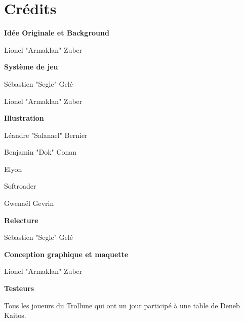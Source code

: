 \clearpage

\chapter*{Crédits}

\begin{center}

\vskip 30pt

\textbf{Idée Originale et Background}

Lionel "Armaklan" Zuber

\vskip 30pt

\textbf{Système de jeu}

Sébastien "Segle" Gelé

Lionel "Armaklan" Zuber

\vskip 30pt

\textbf{Illustration}

Léandre "Salanael" Bernier

Benjamin "Dok" Conan

Elyon

Softroader

Gwenaël Gevrin 

\vskip 30pt

\textbf{Relecture}

Sébastien "Segle" Gelé

\vskip 30pt

\textbf{Conception graphique et maquette}

Lionel "Armaklan" Zuber

\vskip 30pt

\textbf{Testeurs}

Tous les joueurs du Trollune qui ont un jour participé à une table de Deneb Kaitos.



\end{center}
